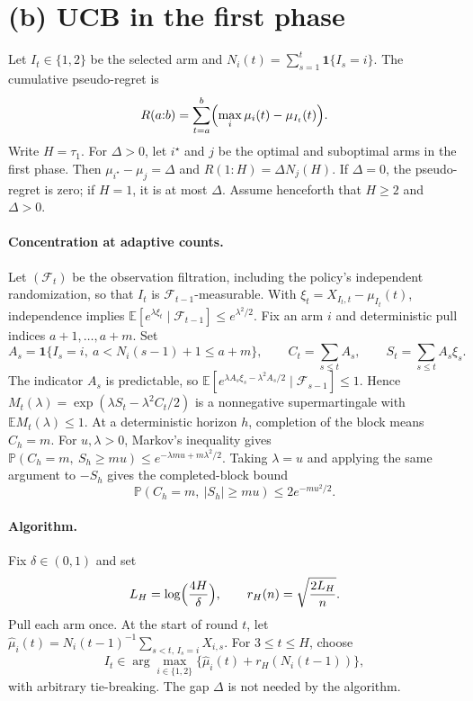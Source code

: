\section{(b) UCB in the first phase}\label{sec:ucb}

Let $I_t\in\{1,2\}$ be the selected arm and $N_i(t)=\sum_{s=1}^t\mathbf 1\{I_s=i\}$. The cumulative pseudo-regret is
\[
R(a{:}b)=\sum_{t=a}^b\Bigl(\max_i\mu_i(t)-\mu_{I_t}(t)\Bigr).
\]
Write $H=\tau_1$. For $\Delta>0$, let $i^\star$ and $j$ be the optimal and suboptimal arms in the first phase. Then $\mu_{i^\star}-\mu_j=\Delta$ and $R(1{:}H)=\Delta N_j(H)$. If $\Delta=0$, the pseudo-regret is zero; if $H=1$, it is at most $\Delta$. Assume henceforth that $H\ge2$ and $\Delta>0$.

\paragraph{Concentration at adaptive counts.} Let $(\mathcal F_t)$ be the observation filtration, including the policy's independent randomization, so that $I_t$ is $\mathcal F_{t-1}$-measurable. With $\xi_t=X_{I_t,t}-\mu_{I_t}(t)$, independence implies $\mathbb E[e^{\lambda\xi_t}\mid\mathcal F_{t-1}]\le e^{\lambda^2/2}$. Fix an arm $i$ and deterministic pull indices $a+1,\dots,a+m$. Set
\[
A_s=\mathbf 1\{I_s=i,\ a<N_i(s-1)+1\le a+m\},\qquad C_t=\sum_{s\le t}A_s,\qquad S_t=\sum_{s\le t}A_s\xi_s.
\]
The indicator $A_s$ is predictable, so $\mathbb E[e^{\lambda A_s\xi_s-\lambda^2A_s/2}\mid\mathcal F_{s-1}]\le1$. Hence $M_t(\lambda)=\exp(\lambda S_t-\lambda^2C_t/2)$ is a nonnegative supermartingale with $\mathbb EM_t(\lambda)\le1$. At a deterministic horizon $h$, completion of the block means $C_h=m$. For $u,\lambda>0$, Markov's inequality gives $\mathbb P(C_h=m,\ S_h\ge mu)\le e^{-\lambda mu+m\lambda^2/2}$. Taking $\lambda=u$ and applying the same argument to $-S_h$ gives the completed-block bound
\begin{equation}\label{eq:block}
\mathbb P(C_h=m,\ |S_h|\ge mu)\le 2e^{-mu^2/2}.
\end{equation}

\paragraph{Algorithm.} Fix $\delta\in(0,1)$ and set
\[
L_H=\log\Bigl(\frac{4H}{\delta}\Bigr),\qquad r_H(n)=\sqrt{\frac{2L_H}{n}}.
\]
Pull each arm once. At the start of round $t$, let $\widehat\mu_i(t)=N_i(t-1)^{-1}\sum_{s<t,\,I_s=i}X_{i,s}$. For $3\le t\le H$, choose
\begin{equation}\label{eq:ucb}
I_t\in\arg\max_{i\in\{1,2\}}\bigl\{\widehat\mu_i(t)+r_H(N_i(t-1))\bigr\},
\end{equation}
with arbitrary tie-breaking. The gap $\Delta$ is not needed by the algorithm.

